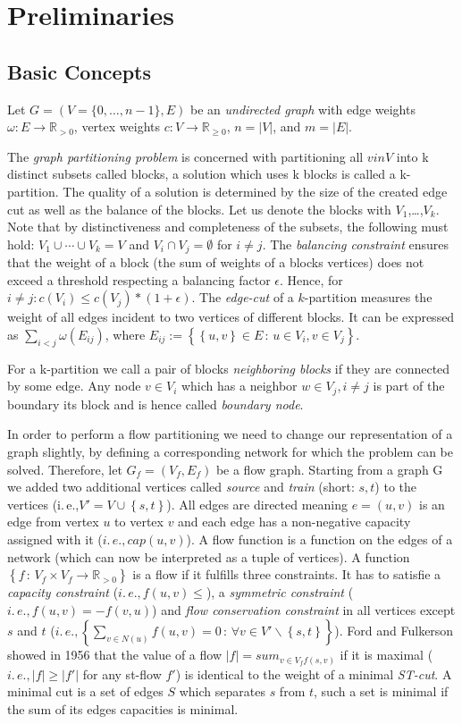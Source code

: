 \documentclass[acmsmall,nonacm,screen,review]{acmart}
\newcommand{\Is}       {:=}
\newcommand{\set}[1]{\left\{ #1\right\}}
\newcommand{\sodass}{\,:\,}
\newcommand{\setGilt}[2]{\left\{ #1\sodass #2\right\}}
\newcommand{\ie}{i.\,e.,\xspace}
\def\MdR{\ensuremath{\mathbb{R}}}
\begin{document}
\section{Preliminaries}
\subsection{Basic Concepts}
\label{subsec:basic_concepts}
Let $G=(V=\{0,\ldots, n-1\},E)$ be an \emph{undirected graph} with edge weights $\omega: 
E \to \MdR_{>0}$, vertex weights $c: V \to \MdR_{\geq 0}$, $n = |V|$, and $m = |E|$.

The \emph{graph partitioning problem} is concerned with partitioning all $v in V$ into k distinct 
subsets called blocks, a solution which uses k blocks is called a k-partition. The quality of a 
solution is determined by the size of the created edge cut as well as the balance of the blocks. 
Let us denote the blocks with $V_1$,\ldots,$V_k$. Note that by distinctiveness and completeness 
of the subsets, the following must hold: $V_1\cup\cdots\cup V_k=V$ and $V_i\cap V_j=\emptyset$ 
for $i\neq j$. The \emph{balancing constraint} ensures that the weight of a block (the sum of
weights of a blocks vertices) does not exceed a threshold respecting a balancing factor 
$\epsilon$. Hence, for $i \neq j: c(V_i)\leq c(V_j)*(1+\epsilon)$. The \emph{edge-cut} of a 
$k$-partition measures the weight of all edges incident to two vertices of different blocks. 
It can be expressed as $\sum_{i<j}\omega(E_{ij})$, where $E_{ij}\Is\setGilt{\set{u,v}\in E}
{u\in V_i,v\in V_j}$. 

For a k-partition we call a pair of blocks \emph{neighboring blocks} if they are connected by some edge.
Any node $v \in V_i$ which has a neighbor $w \in V_j, i\neq j$ is part of the boundary its block 
and is hence called \emph{boundary node}.

In order to perform a flow partitioning we need to change our representation of a graph slightly, by 
defining a corresponding network for which the problem can be solved. Therefore, let $G_f=(V_f,E_f)$
be a flow graph. Starting from a graph G we added two additional vertices called \emph{source} and 
\emph{train} (short: $s,t$) to the vertices (\ie$V'=V \cup \set{s,t}$). All edges are directed meaning
$e=(u,v)$ is an edge from vertex $u$ to vertex $v$ and each edge has a non-negative capacity assigned 
with it ($\ie cap(u,v)$). A flow function is a function on the edges of a network (which can now be 
interpreted as a tuple of vertices). A function $\setGilt{f}{V_f \times V_f \rightarrow\MdR_{>0}}$ is a
flow if it fulfills three constraints. It has to satisfie a \emph{capacity constraint} ($\ie f(u,v)\leq$),
a \emph{symmetric constraint} ($\ie f(u,v)=-f(v,u)$) and \emph{flow conservation constraint} in all 
vertices except $s$ and $t$ ($\ie \setGilt{\sum_{v\in N(u)}f(u,v)=0}{\forall v\in V' \backslash \set{s,t}}$).
Ford and Fulkerson showed in 1956 that the value of a flow $|f|=sum_{v\in V_f f(s,v)}$ if it is maximal 
($\ie |f|\geq|f'|$ for any st-flow $f'$) is identical to the weight of a minimal \emph{ST-cut}. A minimal
cut is a set of edges $S$ which separates $s$ from $t$, such a set is minimal if the sum of its edges
capacities is minimal.  
\end{document}
